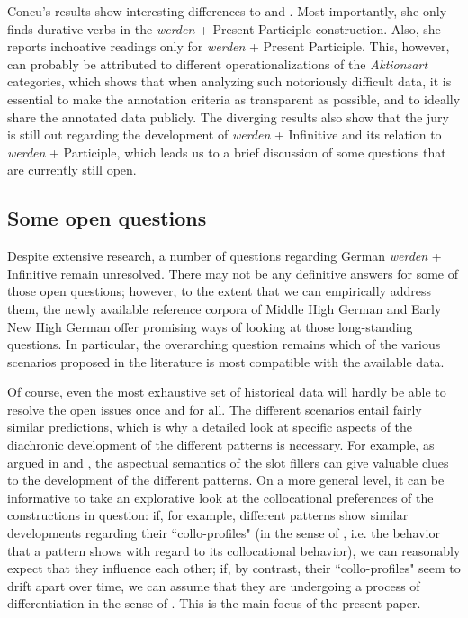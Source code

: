 \documentclass[output=paper,colorlinks,citecolor=brown]{langscibook}
\begin{document}
Concu's results show interesting differences to \citet[]{Hartmann2021}{} and \citet[]{hartmannFuturkonstruktionenImWandel2023}{}. Most importantly, she only finds durative verbs in the \textit{werden} + Present Participle construction. Also, she reports inchoative readings only for \textit{werden} + Present Participle. This, however, can probably be attributed to different operationalizations of the \textit{Aktionsart} categories, which shows that when analyzing such notoriously difficult data, it is essential to make the annotation criteria as transparent as possible, and to ideally share the annotated data publicly. The diverging results also show that the jury is still out regarding the development of \textit{werden} + Infinitive and its relation to \textit{werden} + Participle, which leads us to a brief discussion of some questions that are currently still open.

\subsection{Some open questions} \label{sec:hs:openquestions}

Despite extensive research, a number of questions regarding German \textit{werden} + Infinitive remain unresolved. There may not be any definitive answers for some of those open questions; however, to the extent that we can empirically address them, the newly available reference corpora of Middle High German and Early New High German offer promising ways of looking at those long-standing questions. In particular, the overarching question remains which of the various scenarios proposed in the literature is most compatible with the available data. 

Of course, even the most exhaustive set of historical data will hardly be able to resolve the open issues once and for all. The different scenarios entail fairly similar predictions, which is why a detailed look at specific aspects of the diachronic development of the different patterns is necessary. For example, as argued in \citet[][]{Hartmann2021}{}{} and \citet[]{hartmannFuturkonstruktionenImWandel2023}{}, the aspectual semantics of the slot fillers can give valuable clues to the development of the different patterns. On a more general level, it can be informative to take an explorative look at the collocational preferences of the constructions in question: if, for example, different patterns show similar developments regarding their ``collo-profiles" (in the sense of \citeauthor{herbstValencyArgumentStructure2019} \citeyear{herbstValencyArgumentStructure2019}, i.e. the behavior that a pattern shows with regard to its collocational behavior), we can reasonably expect that they influence each other; if, by contrast, their ``collo-profiles" seem to drift apart over time, we can assume that they are undergoing a process of differentiation in the sense of \citet[]{DeSmet2018}{}. This is the main focus of the present paper. 
\end{document}
